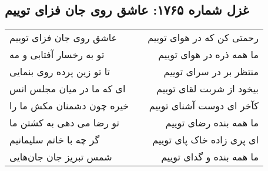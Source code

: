 \begin{center}
\section*{غزل شماره ۱۷۶۵: عاشق روی جان فزای توییم}
\label{sec:1765}
\begin{longtable}{l p{0.5cm} r}
عاشق روی جان فزای توییم
&&
رحمتی کن که در هوای توییم
\\
تو به رخسار آفتابی و مه
&&
ما همه ذره در هوای توییم
\\
تا تو زین پرده روی بنمایی
&&
منتظر بر در سرای توییم
\\
ای که ما در میان مجلس انس
&&
بیخود از شربت لقای توییم
\\
خیره چون دشمنان مکش ما را
&&
کآخر ای دوست آشنای توییم
\\
تو رضا می دهی به کشتن ما
&&
ما همه بنده رضای توییم
\\
گر چه با خاتم سلیمانیم
&&
ای پری زاده خاک پای توییم
\\
شمس تبریز جان جان‌هایی
&&
ما همه بنده و گدای توییم
\\
\end{longtable}
\end{center}
